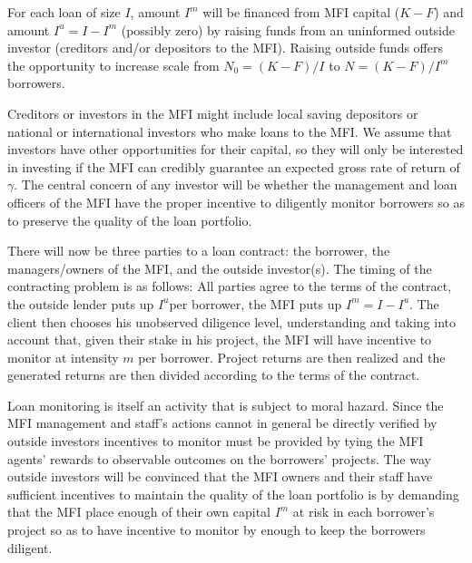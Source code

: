 \documentclass[
]{article}
\begin{document}
For each loan of size \(I\), amount \(I^{m}\) will be financed from MFI
capital (\(K - F\)) and amount \(I^{u} = I - I^{m}\) (possibly zero) by
raising funds from an uninformed outside investor (creditors and/or
depositors to the MFI). Raising outside funds offers the opportunity to
increase scale from \(N_{0} = (K - F)/I\) to \(N = (K - F)/I^{m}\)
borrowers.

Creditors or investors in the MFI might include local saving depositors
or national or international investors who make loans to the MFI. We
assume that investors have other opportunities for their capital, so
they will only be interested in investing if the MFI can credibly
guarantee an expected gross rate of return of \(\gamma\). The central
concern of any investor will be whether the management and loan officers
of the MFI have the proper incentive to diligently monitor borrowers so
as to preserve the quality of the loan portfolio.

There will now be three parties to a loan contract: the borrower, the
managers/owners of the MFI, and the outside investor(s). The timing of
the contracting problem is as follows: All parties agree to the terms of
the contract, the outside lender puts up \(I^{u}\)per borrower, the MFI
puts up \(I^{m} = I - I^{u}.\) The client then chooses his unobserved
diligence level, understanding and taking into account that, given their
stake in his project, the MFI will have incentive to monitor at
intensity \(m\) per borrower. Project returns are then realized and the
generated returns are then divided according to the terms of the
contract.

Loan monitoring is itself an activity that is subject to moral hazard.
Since the MFI management and staff's actions cannot in general be
directly verified by outside investors incentives to monitor must be
provided by tying the MFI agents' rewards to observable outcomes on the
borrowers' projects. The way outside investors will be convinced that
the MFI owners and their staff have sufficient incentives to maintain
the quality of the loan portfolio is by demanding that the MFI place
enough of their own capital \(I^{m}\) at risk in each borrower's project
so as to have incentive to monitor by enough to keep the borrowers
diligent.
\end{document}
